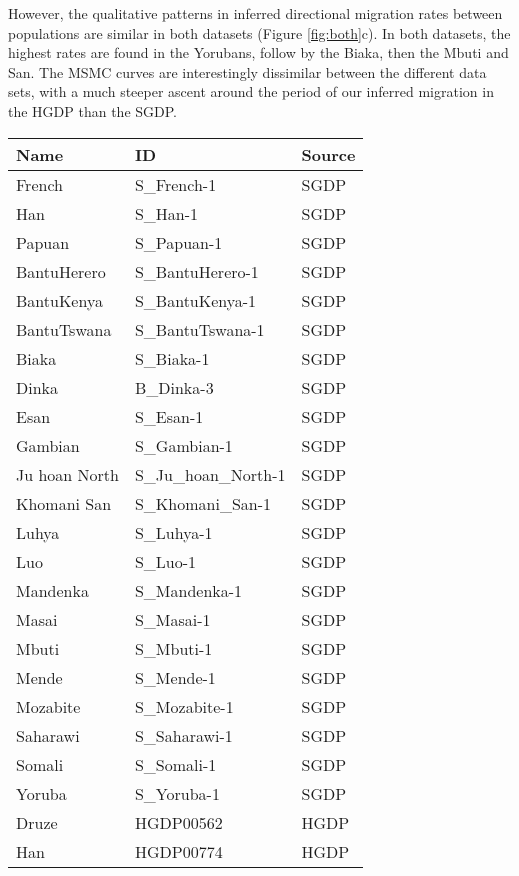 However, the qualitative patterns in inferred directional migration rates between populations are similar in both datasets (Figure \ref{fig:both}c). In both datasets, the highest rates are found in the Yorubans, follow by the Biaka, then the Mbuti and San. The MSMC curves are interestingly dissimilar between the different data sets, with a much steeper ascent around the period of our inferred migration in the HGDP than the SGDP. 


\begin{table}[ht]
    \centering
    \begin{tabular}{lll}
      \hline
    Name & ID & Source \\ 
      \hline
    French & S\_French-1 & SGDP \\ 
      Han & S\_Han-1 & SGDP \\ 
      Papuan & S\_Papuan-1 & SGDP \\ 
      BantuHerero & S\_BantuHerero-1 & SGDP \\ 
      BantuKenya & S\_BantuKenya-1 & SGDP \\ 
      BantuTswana & S\_BantuTswana-1 & SGDP \\ 
      Biaka & S\_Biaka-1 & SGDP \\ 
      Dinka & B\_Dinka-3 & SGDP \\ 
      Esan & S\_Esan-1 & SGDP \\ 
      Gambian & S\_Gambian-1 & SGDP \\ 
      Ju hoan North & S\_Ju\_hoan\_North-1 & SGDP \\ 
      Khomani San & S\_Khomani\_San-1 & SGDP \\ 
      Luhya & S\_Luhya-1 & SGDP \\ 
      Luo & S\_Luo-1 & SGDP \\ 
      Mandenka & S\_Mandenka-1 & SGDP \\ 
      Masai & S\_Masai-1 & SGDP \\ 
      Mbuti & S\_Mbuti-1 & SGDP \\ 
      Mende & S\_Mende-1 & SGDP \\ 
      Mozabite & S\_Mozabite-1 & SGDP \\ 
      Saharawi & S\_Saharawi-1 & SGDP \\ 
      Somali & S\_Somali-1 & SGDP \\ 
      Yoruba & S\_Yoruba-1 & SGDP \\ 
      Druze & HGDP00562 & HGDP \\ 
      Han & HGDP00774 & HGDP \\ 

\end{tabular}
\end{table}

